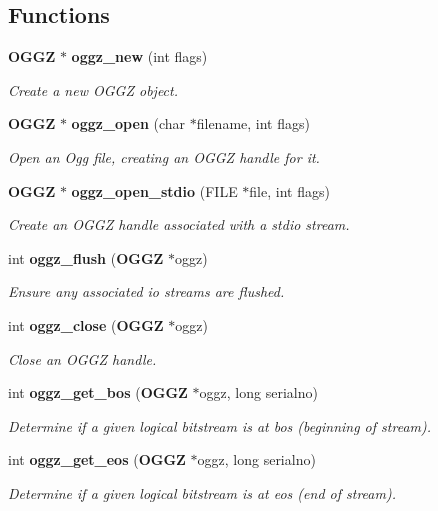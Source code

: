 \subsection*{Functions}
\begin{CompactItemize}
\item 
{\bf OGGZ} $\ast$ {\bf oggz\_\-new} (int flags)
\begin{CompactList}\small\item\em Create a new OGGZ object. \item\end{CompactList}\item 
{\bf OGGZ} $\ast$ {\bf oggz\_\-open} (char $\ast$filename, int flags)
\begin{CompactList}\small\item\em Open an Ogg file, creating an OGGZ handle for it. \item\end{CompactList}\item 
{\bf OGGZ} $\ast$ {\bf oggz\_\-open\_\-stdio} (FILE $\ast$file, int flags)
\begin{CompactList}\small\item\em Create an OGGZ handle associated with a stdio stream. \item\end{CompactList}\item 
int {\bf oggz\_\-flush} ({\bf OGGZ} $\ast$oggz)
\begin{CompactList}\small\item\em Ensure any associated io streams are flushed. \item\end{CompactList}\item 
int {\bf oggz\_\-close} ({\bf OGGZ} $\ast$oggz)
\begin{CompactList}\small\item\em Close an OGGZ handle. \item\end{CompactList}\item 
int {\bf oggz\_\-get\_\-bos} ({\bf OGGZ} $\ast$oggz, long serialno)
\begin{CompactList}\small\item\em Determine if a given logical bitstream is at bos (beginning of stream). \item\end{CompactList}\item 
int {\bf oggz\_\-get\_\-eos} ({\bf OGGZ} $\ast$oggz, long serialno)
\begin{CompactList}\small\item\em Determine if a given logical bitstream is at eos (end of stream). \item\end{CompactList}\item 

\end{CompactItemize}
